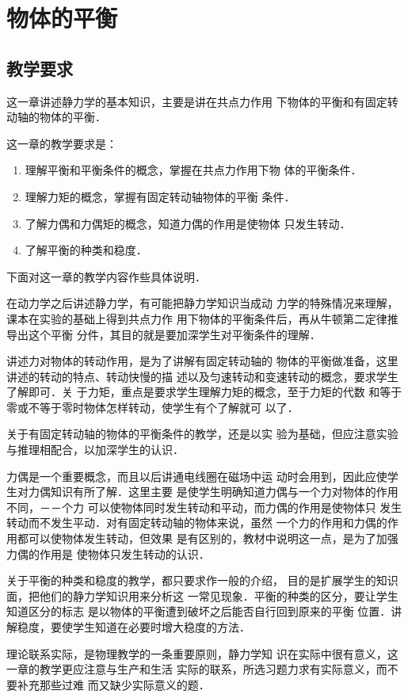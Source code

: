 
\chapter{物体的平衡}\minitoc[n]
\section{教学要求}
这一章讲述静力学的基本知识，主要是讲在共点力作用
下物体的平衡和有固定转动轴的物体的平衡．

这一章的教学要求是：
\begin{enumerate}
\item 理解平衡和平衡条件的概念，掌握在共点力作用下物
体的平衡条件．
\item 理解力矩的概念，掌握有固定转动轴物体的平衡
条件．
\item 了解力偶和力偶矩的概念，知道力偶的作用是使物体
只发生转动．
\item 了解平衡的种类和稳度．
\end{enumerate}

下面对这一章的教学内容作些具体说明．

在动力学之后讲述静力学，有可能把静力学知识当成动
力学的特殊情况来理解，课本在实验的基础上得到共点力作
用下物体的平衡条件后，再从牛顿第二定律推导出这个平衡
分件，其目的就是要加深学生对平衡条件的理解．

讲述力对物体的转动作用，是为了讲解有固定转动轴的
物体的平衡做准备，这里讲述的转动的特点、转动快慢的描
述以及匀速转动和变速转动的概念，要求学生了解即可．关
于力矩，重点是要求学生理解力矩的概念，至于力矩的代数
和等于零或不等于零时物体怎样转动，使学生有个了解就可
以了．

关于有固定转动轴的物体的平衡条件的教学，还是以实
验为基础，但应注意实验与推理相配合，以加深学生的认识．

力偶是一个重要概念，而且以后讲通电线圈在磁场中运
动时会用到，因此应使学生对力偶知识有所了解．这里主要
是使学生明确知道力偶与一个力对物体的作用不同，－－个力
可以使物体同时发生转动和平动，而力偶的作用是使物体只
发生转动而不发生平动．对有固定转动轴的物体来说，虽然
一个力的作用和力偶的作用都可以使物体发生转动，但效果
是有区别的，教材中说明这一点，是为了加强力偶的作用是
使物体只发生转动的认识．

关于平衡的种类和稳度的教学，都只要求作一般的介绍，
目的是扩展学生的知识面，把他们的静力学知识用来分析这
一常见现象．平衡的种类的区分，要让学生知道区分的标志
是以物体的平衡遭到破坏之后能否自行回到原来的平衡
位置．讲解稳度，要使学生知道在必要时增大稳度的方法．

理论联系实际，是物理教学的一条重要原则，静力学知
识在实际中很有意义，这一章的教学更应注意与生产和生活
实际的联系，所选习题力求有实际意义，而不要补充那些过难
而又缺少实际意义的题．

